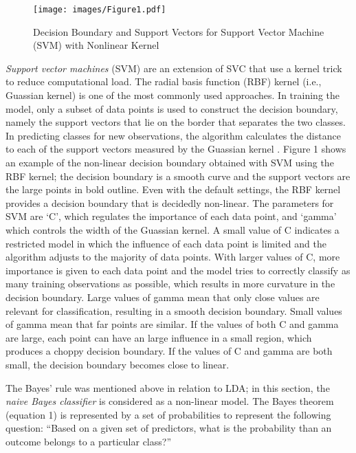 \documentclass[sigconf]{acmart}
\begin{document}
\begin{figure}[!ht]
  \centering\texttt{[image: images/Figure1.pdf]}
  \caption{Decision Boundary and Support Vectors for Support Vector Machine 
  (SVM) with Nonlinear Kernel \cite{muller17}}
  \label{f:Figure1}
\end{figure}


\emph{Support vector machines} (SVM) are an extension of SVC that use a 
kernel trick to reduce computational load. The radial basis function (RBF) 
kernel (i.e., Guassian kernel) is one of the most commonly used approaches. 
In training the model, only a subset of data points is used to construct the 
decision boundary, namely the support vectors that lie on the border that 
separates the two classes. In predicting classes for new observations, the 
algorithm calculates the distance to each of the support vectors measured 
by the Guassian kernel \cite{muller17}. Figure 1 shows an example of the 
non-linear decision boundary obtained with SVM using the RBF kernel; the 
decision boundary is a smooth curve and the support vectors are the large 
points in bold outline. Even with the default settings, the RBF kernel 
provides a decision boundary that is decidedly non-linear. The parameters 
for SVM are `C', which regulates the importance of each data point, and 
`gamma' which controls the width of the Guassian kernel. A small value of 
C indicates a restricted model in which the influence of each data point is 
limited and the algorithm adjusts to the majority of data points. With larger 
values of C, more importance is given to each data point and the model tries 
to correctly classify as many training observations as possible, which results 
in more curvature in the decision boundary. Large values of gamma mean that 
only close values are relevant for classification, resulting in a smooth 
decision boundary. Small values of gamma mean that far points are similar. 
If the values of both C and gamma are large, each point can have an large 
influence in a small region, which produces a choppy decision boundary. 
If the values of C and gamma are both small, the decision boundary becomes 
close to linear.


The Bayes' rule was mentioned above in relation to LDA; in this section, the 
\emph{naive Bayes classifier} is considered as a non-linear model.
The Bayes theorem (equation 1) is represented by a set of probabilities to 
represent the following question: ``Based on a given set of predictors, what
is the probability than an outcome belongs to a particular class?''
\end{document}
